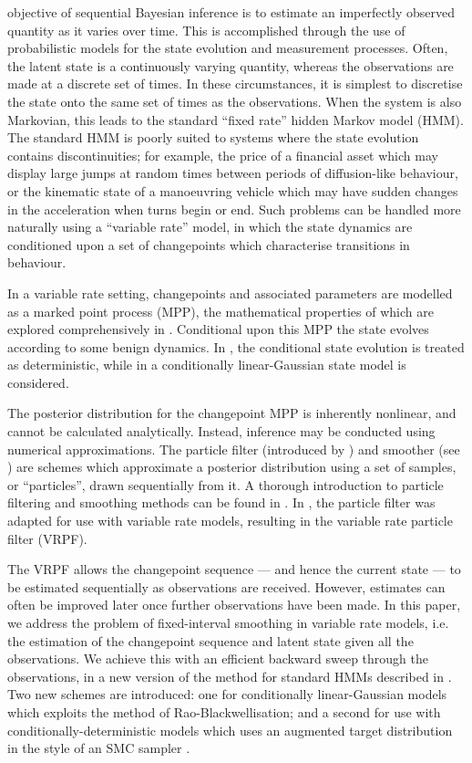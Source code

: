\documentclass[10pt,twocolumn,twoside]{IEEEtran}
\begin{document}
 objective of sequential Bayesian inference is to estimate an imperfectly observed quantity as it varies over time. This is accomplished through the use of probabilistic models for the state evolution and measurement processes. Often, the latent state is a continuously varying quantity, whereas the observations are made at a discrete set of times. In these circumstances, it is simplest to discretise the state onto the same set of times as the observations. When the system is also Markovian, this leads to the standard ``fixed rate'' hidden Markov model (HMM). The standard HMM is poorly suited to systems where the state evolution contains discontinuities; for example, the price of a financial asset which may display large jumps at random times between periods of diffusion-like behaviour, or the kinematic state of a manoeuvring vehicle which may have sudden changes in the acceleration when turns begin or end. Such problems can be handled more naturally using a ``variable rate'' model, in which the state dynamics are conditioned upon a set of changepoints which characterise transitions in behaviour.

In a variable rate setting, changepoints and associated parameters are modelled as a marked point process (MPP), the mathematical properties of which are explored comprehensively in \cite{Jacobsen2006}. Conditional upon this MPP the state evolves according to some benign dynamics. In \cite{Godsill2007,Whiteley2011,Morelande2009a}, the conditional state evolution is treated as deterministic, while in \cite{Godsill2007a,Christensen2012} a conditionally linear-Gaussian state model is considered.

The posterior distribution for the changepoint MPP is inherently nonlinear, and cannot be calculated analytically. Instead, inference may be conducted using numerical approximations. The particle filter (introduced by \cite{Gordon1993}) and smoother (see \cite{Doucet2000a,Godsill2004}) are schemes which approximate a posterior distribution using a set of samples, or ``particles'', drawn sequentially from it.  A thorough introduction to particle filtering and smoothing methods can be found in \cite{Cappe2007,Doucet2009}. In \cite{Godsill2007a,Godsill2007,Whiteley2011}, the particle filter was adapted for use with variable rate models, resulting in the variable rate particle filter (VRPF).

The VRPF allows the changepoint sequence --- and hence the current state --- to be estimated sequentially as observations are received. However, estimates can often be improved later once further observations have been made. In this paper, we address the problem of fixed-interval smoothing in variable rate models, i.e. the estimation of the changepoint sequence and latent state given all the observations. We achieve this with an efficient backward sweep through the observations, in a new version of the method for standard HMMs described in \cite{Godsill2004}. Two new schemes are introduced: one for conditionally linear-Gaussian models which exploits the method of Rao-Blackwellisation; and a second for use with conditionally-deterministic models which uses an augmented target distribution in the style of an SMC sampler \cite{DelMoral2006}.
\end{document}
